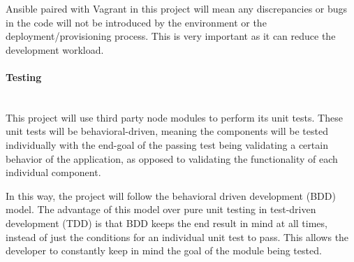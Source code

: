 Ansible paired with Vagrant in this project will mean any discrepancies or bugs in the code will not be introduced by the environment or the deployment/provisioning process. This is very important as it can reduce the development workload. 

\paragraph{Testing}\mbox{}\\
This project will use third party node modules to perform its unit tests. These unit tests will be behavioral-driven, meaning the components will be tested individually with the end-goal of the passing test being validating a certain behavior of the application, as opposed to validating the functionality of each individual component.

In this way, the project will follow the behavioral driven development (BDD) model. The advantage of this model over pure unit testing in test-driven development (TDD) is that BDD keeps the end result in mind at all times, instead of just the conditions for an individual unit test to pass. This allows the developer to constantly keep in mind the goal of the module being tested.
